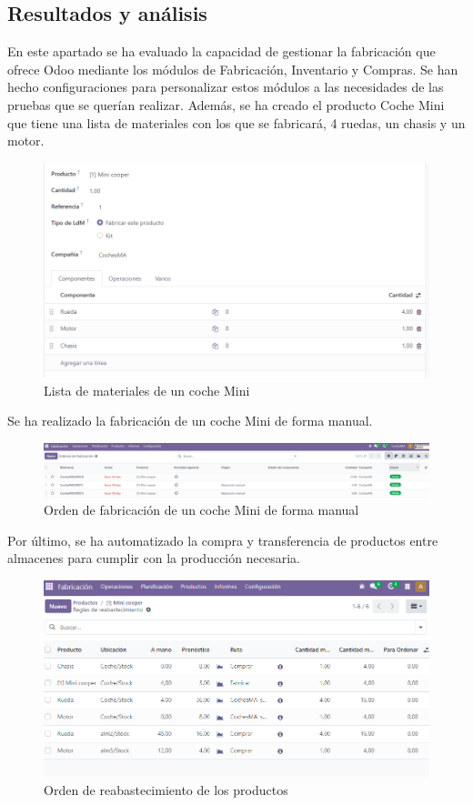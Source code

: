 \subsection{Resultados y análisis}
En este apartado se ha evaluado la capacidad de gestionar la fabricación que ofrece Odoo mediante los módulos de Fabricación, Inventario y Compras. Se han hecho configuraciones para personalizar estos módulos a las necesidades de las pruebas que se querían realizar. Además, se ha creado el producto Coche Mini que tiene una lista de materiales con los que se fabricará, 4 ruedas, un chasis y un motor.
\begin{figure}[h]
    \centering
    \includegraphics[width=1\linewidth]{fotosGestFab/coche.png}
    \caption{Lista de materiales de un coche Mini}
    \label{fig:enter-label}
\end{figure}
Se ha realizado la fabricación de un coche Mini de forma manual.
\begin{figure}[h]
    \centering
    \includegraphics[width=1\linewidth]{fotosGestFab/manual.png}
    \caption{Orden de fabricación de un coche Mini de forma manual}
    \label{fig:enter-label}
\end{figure}
Por último, se ha automatizado la compra y transferencia de productos entre almacenes para cumplir con la producción necesaria.
\begin{figure}[h]
    \centering
    \includegraphics[width=1\linewidth]{fotosGestFab/reabastecimiento.png}
    \caption{Orden de reabastecimiento de los productos}
    \label{fig:enter-label}
\end{figure}

